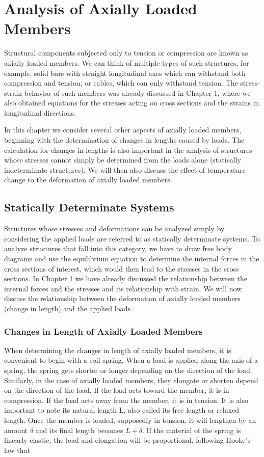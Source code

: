 \documentclass[
10pt,
a4paper,
openany,
svgnames,
]{book} %
\begin{document}
\chapter{Analysis of Axially Loaded Members}

Structural components subjected only to tension or compression are known as axially loaded members. We can think of multiple types of such structures, for example, solid bars with straight longitudinal axes which can withstand both compression and tension, or cables, which can only withstand tension. The stress-strain behavior of such members was already discussed in Chapter 1, where we also obtained equations for the stresses acting on cross sections and the strains in longitudinal directions.

In this chapter we consider several other aspects of axially loaded members, beginning with the determination of changes in lengths caused by loads. The calculation for changes in lengths is also important in the analysis of structures whose stresses cannot simply be determined from the loads alone (statically indeterminate structures). We will then also discuss the effect of temperature change to the deformation of axially loaded members.


\section{Statically Determinate Systems}

Structures whose stresses and deformations can be analyzed simply by considering the applied loads are referred to as statically determinate systems. To analyze structures that fall into this category, we have to draw free body diagrams and use the equilibrium equation to determine the internal forces in the cross sections of interest, which would then lead to the stresses in the cross sections. In Chapter 1 we have already discussed the relationship between the internal forces and the stresses and its relationship with strain. We will now discuss the relationship between the deformation of axially loaded members (change in length) and the applied loads.

\subsection{Changes in Length of Axially Loaded Members}

When determining the changes in length of axially loaded members, it is convenient to begin with a coil spring. When a load is applied along the axis of a spring, the spring gets shorter or longer depending on the direction of the load.
Similarly, in the case of axially loaded members, they elongate or shorten depend on the direction of the load. If the load acts toward the member, it is in compression. If the load acts away from the member, it is in tension. It is also important to note its natural length L, also called its free length or relaxed length. Once the member is loaded, supposedly in tension, it will lengthen by an amount $\delta$ and its final length becomes $L + \delta$. If the material of the spring is linearly elastic, the load and elongation will be proportional, following Hooke’s law that
\end{document}
